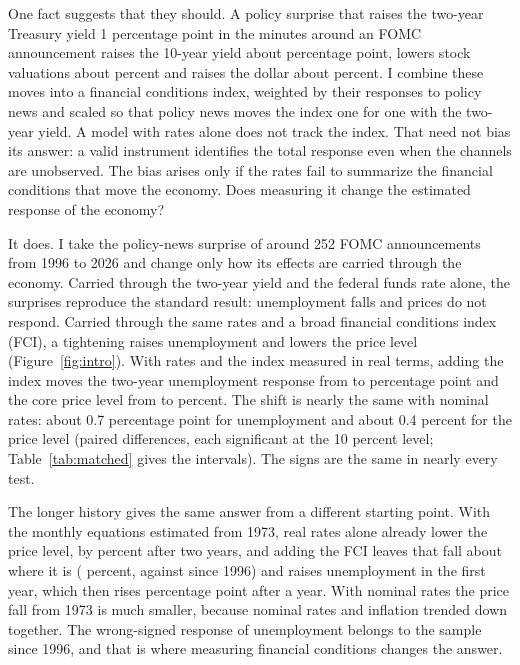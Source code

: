 \documentclass[11pt]{article}
\begin{document}
One fact suggests that they should. A policy surprise that raises the two-year Treasury yield 1 percentage point in the minutes around an FOMC announcement raises the 10-year yield about  percentage point, lowers stock valuations about  percent and raises the dollar about  percent. I combine these moves into a financial conditions index, weighted by their responses to policy news and scaled so that policy news moves the index one for one with the two-year yield. A model with rates alone does not track the index. That need not bias its answer: a valid instrument identifies the total response even when the channels are unobserved. The bias arises only if the rates fail to summarize the financial conditions that move the economy. Does measuring it change the estimated response of the economy?

It does. I take the policy-news surprise of \citet{nakamura2018} around 252 FOMC announcements from 1996 to 2026 and change only how its effects are carried through the economy. Carried through the two-year yield and the federal funds rate alone, the surprises reproduce the standard result: unemployment falls and prices do not respond. Carried through the same rates and a broad financial conditions index (FCI), a tightening raises unemployment and lowers the price level (Figure~\ref{fig:intro}). With rates and the index measured in real terms, adding the index moves the two-year unemployment response from  to  percentage point and the core price level from  to  percent. The shift is nearly the same with nominal rates: about 0.7 percentage point for unemployment and about 0.4 percent for the price level (paired differences, each significant at the 10 percent level; Table~\ref{tab:matched} gives the intervals). The signs are the same in nearly every test.

The longer history gives the same answer from a different starting point. With the monthly equations estimated from 1973, real rates alone already lower the price level, by  percent after two years, and adding the FCI leaves that fall about where it is ( percent, against  since 1996) and raises unemployment in the first year, which then rises  percentage point after a year. With nominal rates the price fall from 1973 is much smaller, because nominal rates and inflation trended down together. The wrong-signed response of unemployment belongs to the sample since 1996, and that is where measuring financial conditions changes the answer.
\end{document}
